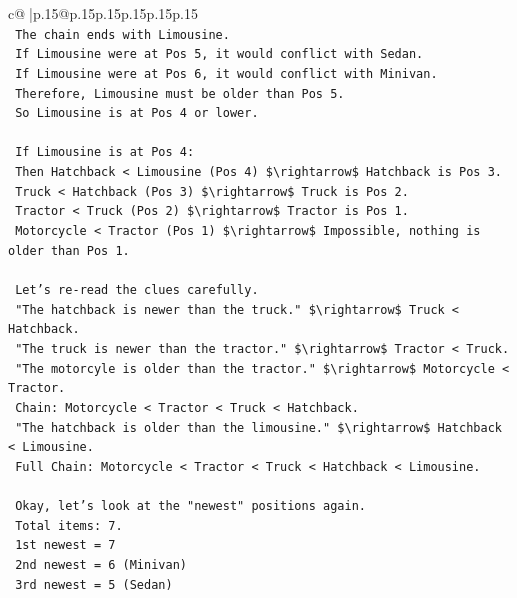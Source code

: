 \documentclass{article}
\begin{document}
{\begin{supertabular}{c@{$\;$}|p{.15\linewidth}@{}p{.15\linewidth}p{.15\linewidth}p{.15\linewidth}p{.15\linewidth}p{.15\linewidth}}
{{{\\ 
\texttt{    The chain ends with Limousine.} \\
\texttt{    If Limousine were at Pos 5, it would conflict with Sedan.} \\
\texttt{    If Limousine were at Pos 6, it would conflict with Minivan.} \\
\texttt{    Therefore, Limousine must be older than Pos 5.} \\
\texttt{    So Limousine is at Pos 4 or lower.} \\
\\ 
\texttt{    If Limousine is at Pos 4:} \\
\texttt{    Then Hatchback < Limousine (Pos 4) \$\textbackslash{}rightarrow\$ Hatchback is Pos 3.} \\
\texttt{    Truck < Hatchback (Pos 3) \$\textbackslash{}rightarrow\$ Truck is Pos 2.} \\
\texttt{    Tractor < Truck (Pos 2) \$\textbackslash{}rightarrow\$ Tractor is Pos 1.} \\
\texttt{    Motorcycle < Tractor (Pos 1) \$\textbackslash{}rightarrow\$ Impossible, nothing is older than Pos 1.} \\
\\ 
\texttt{    Let's re{-}read the clues carefully.} \\
\texttt{    "The hatchback is newer than the truck." \$\textbackslash{}rightarrow\$ Truck < Hatchback.} \\
\texttt{    "The truck is newer than the tractor." \$\textbackslash{}rightarrow\$ Tractor < Truck.} \\
\texttt{    "The motorcyle is older than the tractor." \$\textbackslash{}rightarrow\$ Motorcycle < Tractor.} \\
\texttt{    Chain: Motorcycle < Tractor < Truck < Hatchback.} \\
\texttt{    "The hatchback is older than the limousine." \$\textbackslash{}rightarrow\$ Hatchback < Limousine.} \\
\texttt{    Full Chain: Motorcycle < Tractor < Truck < Hatchback < Limousine.} \\
\\ 
\texttt{    Okay, let's look at the "newest" positions again.} \\
\texttt{    Total items: 7.} \\
\texttt{    1st newest = 7} \\
\texttt{    2nd newest = 6 (Minivan)} \\
\texttt{    3rd newest = 5 (Sedan)} \\
}}}
\end{supertabular}}
\end{document}
